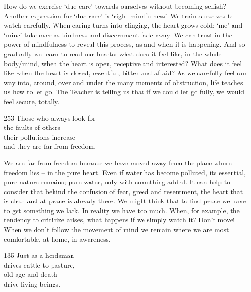 \begin{dhpRefl}
How do we exercise `due care' towards ourselves without becoming selfish? Another expression for `due care' is `right mindfulness'. We train ourselves to watch carefully. When caring turns into clinging, the heart grows cold; `me' and `mine' take over as kindness and discernment fade away. We can trust in the power of mindfulness to reveal this process, as and when it is happening. And so gradually we learn to read our hearts: what does it feel like, in the whole body/mind, when the heart is open, receptive and interested? What does it feel like when the heart is closed, resentful, bitter and afraid? As we carefully feel our way into, around, over and under the many moments of obstruction, life teaches us how to let go. The Teacher is telling us that if we could let go fully, we would feel secure, totally.
\end{dhpRefl}


\begin{dhpVerse}{253}
\label{dhp-253}
Those who always look for\\
the faults of others –\\
their pollutions increase\\
and they are far from freedom.
\end{dhpVerse}

\begin{dhpRefl}
We are far from freedom because we have moved away from the place where freedom lies – in the pure heart. Even if water has become polluted, its essential, pure nature remains; pure water, only with something added. It can help to consider that behind the confusion of fear, greed and resentment, the heart that is clear and at peace is already there. We might think that to find peace we have to get something we lack. In reality we have too much. When, for example, the tendency to criticize arises, what happens if we simply watch it? Don't move! When we don't follow the movement of mind we remain where we are most comfortable, at home, in awareness.
\end{dhpRefl}


\begin{dhpVerse}{135}
\label{dhp-135}
Just as a herdsman\\
drives cattle to pasture,\\
old age and death\\
drive living beings.
\end{dhpVerse}

